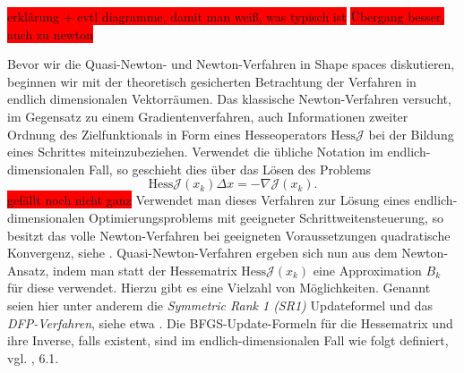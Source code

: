 \colorbox{red}{erklärung + evtl diagramme, damit man weiß, was typisch ist}
\colorbox{red}{Übergang besser, auch zu newton}


Bevor wir die Quasi-Newton- und Newton-Verfahren in Shape spaces diskutieren, beginnen wir mit der theoretisch gesicherten Betrachtung der Verfahren in endlich dimensionalen Vektorräumen. Das klassische Newton-Verfahren versucht, im Gegensatz zu einem Gradientenverfahren, auch Informationen zweiter Ordnung des Zielfunktionals in Form eines Hesseoperators $\text{Hess} \mathcal{J}$ bei der Bildung eines Schrittes miteinzubeziehen. Verwendet die übliche Notation im endlich-dimensionalen Fall, so geschieht dies über das Lösen des Problems
\begin{equation}\label{newtonfinite}
	\text{Hess} \mathcal{J} (x_k)\Delta x = - \nabla \mathcal{J}(x_k).
\end{equation}
\colorbox{red}{gefällt noch nicht ganz}
Verwendet man dieses Verfahren zur Lösung eines endlich-dimensionalen Optimierungsproblems mit geeigneter Schrittweitensteuerung, so besitzt das volle Newton-Verfahren bei geeigneten Voraussetzungen quadratische Konvergenz, siehe \cite{Nocedal}. Quasi-Newton-Verfahren ergeben sich nun aus dem Newton-Ansatz, indem man statt der Hessematrix $\text{Hess}\mathcal{J}(x_k)$ eine Approximation $B_k$ für diese verwendet. Hierzu gibt es eine Vielzahl von Möglichkeiten. Genannt seien hier unter anderem die \textit{Symmetric Rank 1 (SR1)} Updateformel und das \textit{DFP-Verfahren}, siehe etwa \cite{Nocedal}. Die BFGS-Update-Formeln für die Hessematrix und ihre Inverse, falls existent, sind im endlich-dimensionalen Fall wie folgt definiert, vgl. \cite{Nocedal}, 6.1.

